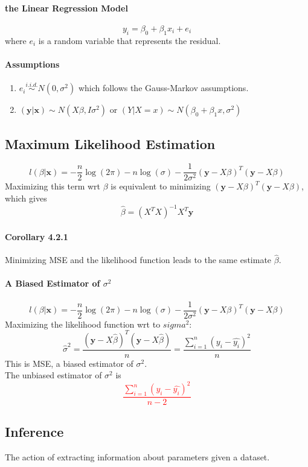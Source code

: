 \documentclass[11pt]{article}
\newcommand{\tb}[1]{\textbf{#1}}
\newcommand{\vx}[0]{\tb{x}}
\newcommand{\vy}[0]{\tb{y}}
\begin{document}
\paragraph{the Linear Regression Model}
$$y_i = \beta_0 + \beta_1x_i + e_i$$
where $e_i$ is a random variable that represents the residual. \\
\paragraph{Assumptions}
\begin{enumerate}
    \item $e_i \overset{i.i.d.}{\sim} N(0, \sigma^2)$ which follows the Gauss-Markov assumptions. 
    \item $(\vy|\vx) \sim N(X\beta, I\sigma^2)$ or $(Y|X = x) \sim N(\beta_0 + \beta_1x, \sigma^2)$
\end{enumerate}
\subsection{Maximum Likelihood Estimation}
$$l(\beta | \vx) = -\frac{n}{2}\log(2\pi) - n\log(\sigma) - \frac{1}{2\sigma^2} (\vy - X \beta)^T(\vy - X\beta)$$
Maximizing this term wrt $\beta$ is equivalent to minimizing $(\vy - X\beta)^T(\vy-X\beta)$, which gives $$\hat{\beta} = (X^TX)^{-1}X^T\vy$$
\paragraph{Corollary 4.2.1}
Minimizing MSE and the likelihood function leads to the same estimate $\hat{\beta}$.
\paragraph{A Biased Estimator of $\sigma^2$}
$$l(\beta | \vx) = -\frac{n}{2}\log(2\pi) - n\log(\sigma) - \frac{1}{2\sigma^2} (\vy - X \beta)^T(\vy - X\beta)$$
Maximizing the likelihood function wrt to $sigma^2$:
$${\hat{\sigma}}^2 = \frac{(\vy - X\hat{\beta})^T(\vy-X\hat{\beta})}{n} = \frac{\sum_{i=1}^n(y_i-\hat{y_i})^2}{n}$$
This is MSE, a biased estimator of $\sigma^2$. \\
The unbiased estimator of $\sigma^2$ is \textcolor{red}{$$\frac{\sum_{i=1}^n(y_i-\hat{y_i})^2}{n-2}$$}
\subsection{Inference}
The action of extracting information about parameters given a dataset.\\
\end{document}
